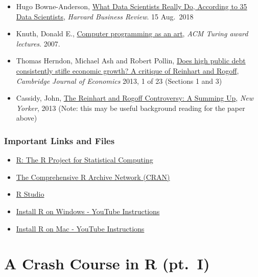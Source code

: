 \documentclass[
]{book}
\providecommand{\tightlist}{%
  \setlength{\itemsep}{0pt}\setlength{\parskip}{0pt}}
\begin{document}
\begin{itemize}
\tightlist
\item
  Hugo Bowne-Anderson, \href{https://hbr.org/2018/08/what-data-scientists-really-do-according-to-35-data-scientists}{What Data Scientists Really Do, According to 35 Data Scientists}, \emph{Harvard Business Review}. 15 Aug.~2018
\item
  Knuth, Donald E., \href{https://dl.acm.org/doi/pdf/10.1145/1283920.1283929}{Computer programming as an art}, \emph{ACM Turing award lectures}. 2007.
\item
  Thomas Herndon, Michael Ash and Robert Pollin, \href{http://citeseerx.ist.psu.edu/viewdoc/download?doi=10.1.1.641.3345\&rep=rep1\&type=pdf}{Does high public debt consistently stifle economic growth? A critique of Reinhart and Rogoff}, \emph{Cambridge Journal of Economics} 2013, 1 of 23 (Sections 1 and 3)
\item
  Cassidy, John, \href{https://www.newyorker.com/news/john-cassidy/the-reinhart-and-rogoff-controversy-a-summing-up}{The Reinhart and Rogoff Controversy: A Summing Up}, \emph{New Yorker}, 2013 (Note: this may be useful background reading for the paper above)
\end{itemize}

\hypertarget{important-links-and-files-1}{%
\section*{Important Links and Files}\label{important-links-and-files-1}}

\begin{itemize}
\tightlist
\item
  \href{https://www.r-project.org/}{R: The R Project for Statistical Computing}
\item
  \href{https://cran.r-project.org/}{The Comprehensive R Archive Network (CRAN)}
\item
  \href{https://www.rstudio.com/products/rstudio/}{R Studio}
\item
  \href{https://www.youtube.com/watch?v=Ohnk9hcxf9M}{Install R on Windows - YouTube Instructions}
\item
  \href{https://www.youtube.com/watch?v=uxuuWXU-7UQ}{Install R on Mac - YouTube Instructions}
\end{itemize}

\hypertarget{part-a-crash-course-in-r-pt.-i}{%
\part{A Crash Course in R (pt.~I)}\label{part-a-crash-course-in-r-pt.-i}}
\end{document}
